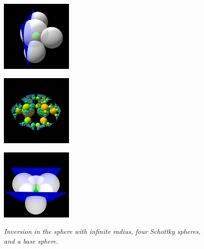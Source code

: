 \begin{figure}[h!tbp]
 \begin{minipage}[t]{0.5\hsize}
  \begin{minipage}{0.25\hsize}
   \center
   \includegraphics[width=1.4in, height=1.4in, keepaspectratio]{./img/application/3dGen/infSphereGen.pdf}
   \label{fig:infSphereGen}
  \end{minipage}
  \hspace*{\fill}
  \begin{minipage}{0.25\hsize}
   \center
   \includegraphics[width=1.4in, height=1.4in, keepaspectratio]{./img/application/3dGen/infSphereOrbit.pdf}
   \label{fig:infSphereOrb}
  \end{minipage}
  \hspace*{\fill}
  \caption{\textit{Inversion in the sphere with infinite radius, four
  Schottky spheres, and a base sphere.}}
  \label{fig:infSphere}
 \end{minipage}
 \hspace*{\fill}
 \begin{minipage}[t]{0.5\hsize}
  \begin{minipage}{0.25\hsize}
   \center
   \includegraphics[width=1.4in, height=1.4in, keepaspectratio]{./img/application/3dGen/translationGen.pdf}
   \label{fig:translation3dGen}
  \end{minipage}

\end{minipage}
\end{figure}
